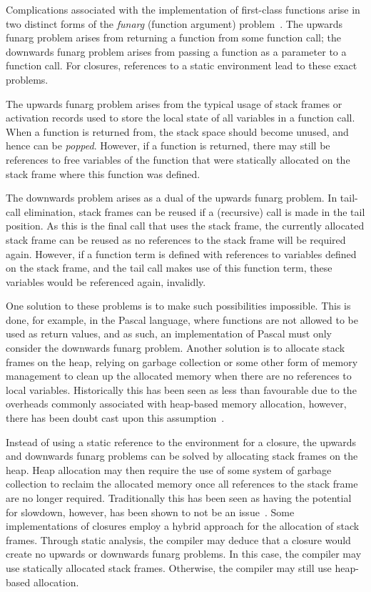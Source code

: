 Complications associated with the implementation of first-class functions arise in two distinct forms of the \textit{funarg} (function argument) problem~\cite{sandwell1971proposed,moses1970function}. The upwards funarg problem arises from returning a function from some function call; the downwards funarg problem arises from passing a function as a parameter to a function call. For closures, references to a static environment lead to these exact problems.

The upwards funarg problem arises from the typical usage of stack frames or activation records used to store the local state of all variables in a function call. When a function is returned from, the stack space should become unused, and hence can be \textit{popped}. However, if a function is returned, there may still be references to free variables of the function that were statically allocated on the stack frame where this function was defined.

The downwards problem arises as a dual of the upwards funarg problem. In tail-call elimination, stack frames can be reused if a (recursive) call is made in the tail position. As this is the final call that uses the stack frame, the currently allocated stack frame can be reused as no references to the stack frame will be required again. However, if a function term is defined with references to variables defined on the stack frame, and the tail call makes use of this function term, these variables would be referenced again, invalidly.

One solution to these problems is to make such possibilities impossible. This is done, for example, in the Pascal language, where functions are not allowed to be used as return values, and as such, an implementation of Pascal must only consider the downwards funarg problem. Another solution is to allocate stack frames on the heap, relying on garbage collection or some other form of memory management to clean up the allocated memory when there are no references to local variables. Historically this has been seen as less than favourable due to the overheads commonly associated with heap-based memory allocation, however, there has been doubt cast upon this assumption~\cite{appel1987garbage, appel1996empirical}. 

Instead of using a static reference to the environment for a closure, the upwards and downwards funarg problems can be solved by allocating stack frames on the heap. Heap allocation may then require the use of some system of garbage collection to reclaim the allocated memory once all references to the stack frame are no longer required. Traditionally this has been seen as having the potential for slowdown, however, has been shown to not be an issue~\cite{appel1987garbage,appel1996empirical}. Some implementations of closures employ a hybrid approach for the allocation of stack frames. Through static analysis, the compiler may deduce that a closure would create no upwards or downwards funarg problems. In this case, the compiler may use statically allocated stack frames. Otherwise, the compiler may still use heap-based allocation. 

